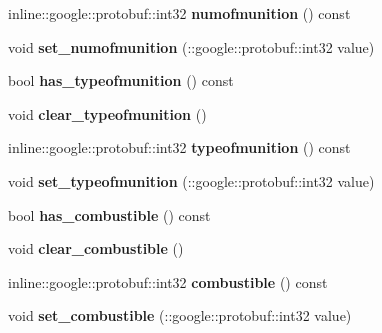\begin{DoxyCompactItemize}
\item 
\hypertarget{class_player_status_ab687554cb754eb588560c88fe4463c9c}{inline\-::google\-::protobuf\-::int32 {\bfseries numofmunition} () const }\label{class_player_status_ab687554cb754eb588560c88fe4463c9c}

\item 
\hypertarget{class_player_status_a4c2212ad0929db7347b7cd7b4dcb9f81}{void {\bfseries set\-\_\-numofmunition} (\-::google\-::protobuf\-::int32 value)}\label{class_player_status_a4c2212ad0929db7347b7cd7b4dcb9f81}

\item 
\hypertarget{class_player_status_a4bab5a0a30765503c645b4350bb7fde8}{bool {\bfseries has\-\_\-typeofmunition} () const }\label{class_player_status_a4bab5a0a30765503c645b4350bb7fde8}

\item 
\hypertarget{class_player_status_ad37747c7d34b4104483fae73f48891a5}{void {\bfseries clear\-\_\-typeofmunition} ()}\label{class_player_status_ad37747c7d34b4104483fae73f48891a5}

\item 
\hypertarget{class_player_status_a7438b0ef8fc2f48f1a015dc0366c187b}{inline\-::google\-::protobuf\-::int32 {\bfseries typeofmunition} () const }\label{class_player_status_a7438b0ef8fc2f48f1a015dc0366c187b}

\item 
\hypertarget{class_player_status_a71302f023e61c011a72a257c8ea5cb6e}{void {\bfseries set\-\_\-typeofmunition} (\-::google\-::protobuf\-::int32 value)}\label{class_player_status_a71302f023e61c011a72a257c8ea5cb6e}

\item 
\hypertarget{class_player_status_a5fd8e8bc7150715dff17890d0f2ba2b5}{bool {\bfseries has\-\_\-combustible} () const }\label{class_player_status_a5fd8e8bc7150715dff17890d0f2ba2b5}

\item 
\hypertarget{class_player_status_adbfd6aeb497ff46eeec87cbb9241b45e}{void {\bfseries clear\-\_\-combustible} ()}\label{class_player_status_adbfd6aeb497ff46eeec87cbb9241b45e}

\item 
\hypertarget{class_player_status_abffad29c44d3df78f1f0e16da159a570}{inline\-::google\-::protobuf\-::int32 {\bfseries combustible} () const }\label{class_player_status_abffad29c44d3df78f1f0e16da159a570}

\item 
\hypertarget{class_player_status_a6ccd28b6811ebadefa2378881a22fc14}{void {\bfseries set\-\_\-combustible} (\-::google\-::protobuf\-::int32 value)}\label{class_player_status_a6ccd28b6811ebadefa2378881a22fc14}

\end{DoxyCompactItemize}
